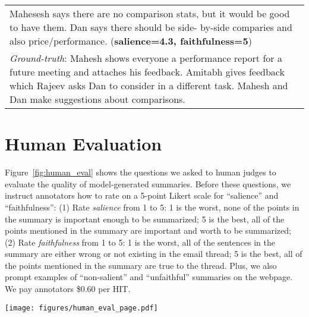 \begin{table*}
\begin{center}
\begin{tabular}{p{\textwidth}}
Mahesesh says there are no comparison stats, but it would be good to have them.
Dan says there should be side- by-side comparies and also price/performance. (\textbf{salience=4.3, faithfulness=5})\\
\emph{Ground-truth}: Mahesh shows everyone a performance report for a future meeting and attaches his feedback. Amitabh gives feedback which Rajeev asks Dan to consider in a different task. Mahesh and Dan make suggestions about comparisons. \\
\bottomrule
\end{tabular}
\end{center}
\vspace{-12pt}
\caption{Examples of high-quality summaries generated by model. Emails are separated by `$\vert\vert\vert$' and some content are omit by `...'. (\textbf{salience=xx, faithfulness=xx}) gives the average human rating for that summary.}
\vspace{-12pt}
\label{tab:high-example}
\end{table*}

\section{Human Evaluation}
\label{appendix:human}
Figure~\ref{fig:human_eval} shows the questions we asked to human judges to evaluate the quality of model-generated summaries. Before these questions, we instruct annotators how to rate on a 5-point Likert scale for ``salience'' and ``faithfulness'': (1) Rate \emph{salience} from 1 to 5: 1 is the worst, none of the points in the summary is important enough to be summarized; 5 is the best, all of the points mentioned in the summary are important and worth to be summarized; (2) Rate \emph{faithfulness} from 1 to 5: 1 is the worst, all of the sentences in the summary are either wrong or not existing in the email thread; 5 is the best, all of the points mentioned in the summary are true to the thread. Plus, we also prompt examples of ``non-salient'' and ``unfaithful'' summaries on the webpage. We pay annotators \$0.60 per HIT.


\begin{figure*}
    \centering
    \texttt{[image: figures/human\_eval\_page.pdf]}
    \vspace{-10pt}
    \caption{A part of the Amazon Mechanical Turk webpage used for human evaluation.}
    \label{fig:human_eval}
    \vspace{-12pt}
\end{figure*}


